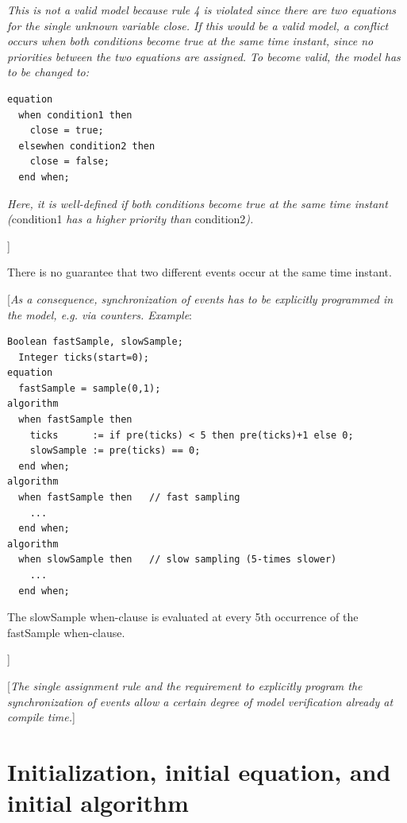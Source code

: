 \documentclass[10pt,a4paper]{report}
\def\doublelabel#1{\label{#1}}
\begin{document}
\emph{This is not a valid model because rule 4 is violated since there
are two equations for the single unknown variable close. If this would
be a valid model, a conflict occurs when both conditions become true at
the same time instant, since no priorities between the two equations are
assigned. To become valid, the model has to be changed to:}

\begin{lstlisting}[language=modelica]
equation
  when condition1 then
    close = true;
  elsewhen condition2 then
    close = false;
  end when; 
\end{lstlisting}

\emph{Here, it is well-defined if both conditions become true at the
same time instant (}condition1 \emph{has a higher priority than}
condition2\emph{).}

{]}

There is no guarantee that two different events occur at the same time
instant.

{[}\emph{As a consequence, synchronization of events has to be
explicitly programmed in the model, e.g. via counters. Example}:

\begin{lstlisting}[language=modelica]
  Boolean fastSample, slowSample;
  Integer ticks(start=0);
equation
  fastSample = sample(0,1);
algorithm
  when fastSample then
    ticks      := if pre(ticks) < 5 then pre(ticks)+1 else 0;
	slowSample := pre(ticks) == 0;
  end when; 
algorithm
  when fastSample then   // fast sampling     
    ...   
  end when; 
algorithm   
  when slowSample then   // slow sampling (5-times slower)
    ...   
  end when;
\end{lstlisting}

The slowSample when-clause is evaluated at every 5th occurrence of the
fastSample when-clause.

{]}

{[}\emph{The single assignment rule and the requirement to explicitly
program the synchronization of events allow a certain degree of model
verification already at compile time.}{]}

\section{Initialization, initial equation, and initial algorithm}\doublelabel{initialization-initial-equation-and-initial-algorithm}
\end{document}
